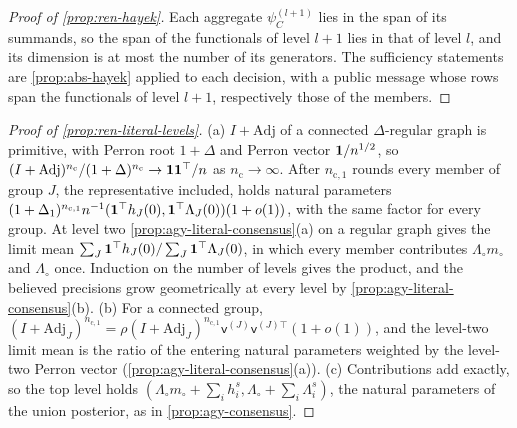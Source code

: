 \begin{proof}[Proof of \cref{prop:ren-hayek}]
Each aggregate $\psi^{(l+1)}_C$ lies in the span of its summands, so the span of the functionals of level $l+1$ lies in that of level $l$, and its dimension is at most the number of its generators. The sufficiency statements are \cref{prop:abs-hayek} applied to each decision, with a public message whose rows span the functionals of level $l+1$, respectively those of the members.
\end{proof}

\begin{proof}[Proof of \cref{prop:ren-literal-levels}]
(a) $I+\mathrm{Adj}$ of a connected $\Delta$-regular graph is primitive, with Perron root $1+\Delta$ and Perron vector $\mathbf{1}/n^{1/2}$, so $(I+\mathrm{Adj})^{n_{\mathrm c}}/(1+\Delta)^{n_{\mathrm c}}\to\mathbf{1}\mathbf{1}^\top/n$ as $n_{\mathrm c}\to\infty$. After $n_{\mathrm c,1}$ rounds every member of group $J$, the representative included, holds natural parameters $(1+\Delta_1)^{n_{\mathrm c,1}}n^{-1}(\mathbf{1}^\top h_J(0),\mathbf{1}^\top\Lambda_J(0))(1+o(1))$, with the same factor for every group. At level two \cref{prop:agy-literal-consensus}(a) on a regular graph gives the limit mean $\sum_J\mathbf{1}^\top h_J(0)/\sum_J\mathbf{1}^\top\Lambda_J(0)$, in which every member contributes $\Lambda_\circ m_\circ$ and $\Lambda_\circ$ once. Induction on the number of levels gives the product, and the believed precisions grow geometrically at every level by \cref{prop:agy-literal-consensus}(b). (b) For a connected group, $(I+\mathrm{Adj}_J)^{n_{\mathrm c,1}}=\rho(I+\mathrm{Adj}_J)^{n_{\mathrm c,1}}\mathsf v^{(J)}\mathsf v^{(J)\top}(1+o(1))$, and the level-two limit mean is the ratio of the entering natural parameters weighted by the level-two Perron vector (\cref{prop:agy-literal-consensus}(a)). (c) Contributions add exactly, so the top level holds $(\Lambda_\circ m_\circ+\sum_ih^s_i,\Lambda_\circ+\sum_i\Lambda^s_i)$, the natural parameters of the union posterior, as in \cref{prop:agy-consensus}.
\end{proof}

